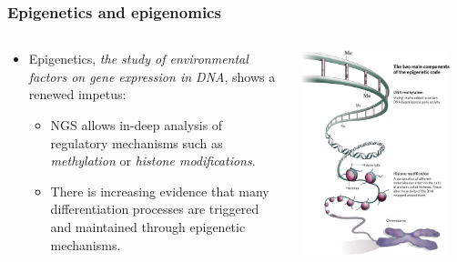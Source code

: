 \documentclass[handout]{beamer}
\begin{document}
\begin{frame}
\frametitle{Epigenetics and epigenomics}
\begin{columns}
\begin{column}{.5\linewidth}
\begin{itemize}
\item Epigenetics, \emph{the study of environmental factors on gene
    expression in DNA}, shows a renewed impetus:
\begin{itemize}
\item NGS allows in-deep analysis of regulatory mechanisms such as
  \emph{methylation} or \emph{histone modifications}.
\item There is increasing evidence that many differentiation processes
  are triggered and maintained through epigenetic mechanisms.
\end{itemize} 
\end{itemize} 
\end{column}
 \begin{column}{.5\linewidth}
\includegraphics[width=0.9\textwidth]{./images/epigeneticsMechanisms.jpg}
 \end{column}
\end{columns}
\end{frame}
\end{document}
